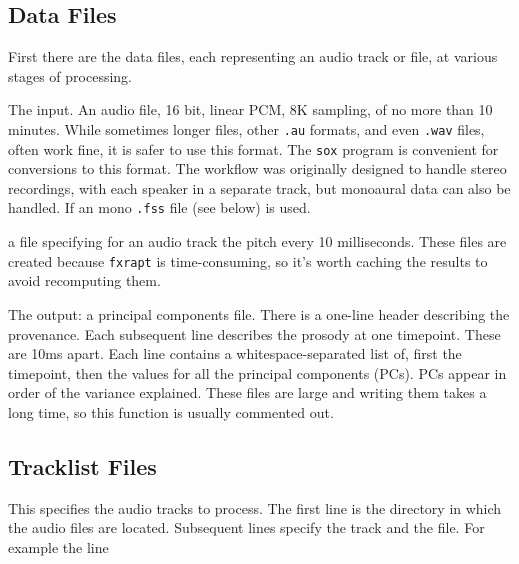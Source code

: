 \documentclass[11pt]{article}
\begin{document}
\subsection{Data Files}

First there are the data files, each representing an audio track or
file, at various stages of processing.

\begin{description}   \setlength{\itemsep}{0pt}\setlength{\parskip}{0pt}

\item [---.au] The input.  An audio file, 16 bit, linear PCM, 8K
  sampling, of no more than 10 minutes.  While sometimes longer files,
  other {\tt .au} formats, and even {\tt .wav} files, often work fine,
  it is safer to use this format. The {\tt sox} program is convenient
  for conversions to this format.  The workflow was originally
  designed to handle stereo recordings, with each speaker in a
  separate track, but monoaural data can also be handled.  If an mono
  {\tt .fss} file (see below) is used.

\item[---f0.mat] a file specifying for an audio track the pitch every
  10 milliseconds.  These files are created because {\tt fxrapt} is
  time-consuming, so it's worth caching the results to avoid
  recomputing them.

\item[---.pc] The output: a principal components file.  There is a
  one-line header describing the provenance.  Each subsequent line
  describes the prosody at one timepoint.  These are 10ms apart.  Each
  line contains a whitespace-separated list of, first the timepoint,
  then the values for all the principal components (PCs).  PCs appear
  in order of the variance explained.  These files are large and
  writing them takes a long time, so this function is usually
  commented out.
\end{description}


\subsection{Tracklist Files}       \label{tracklist-files}

This specifies the audio tracks to process.  The first line is the
directory in which the audio files are located.  Subsequent lines
specify the track and the file.  For example the line
\end{document}
